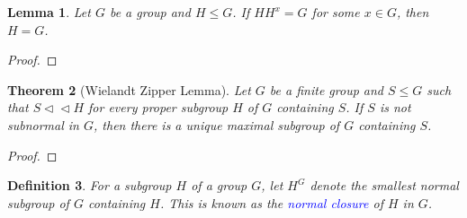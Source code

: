 \documentclass[12pt]{article}
\theoremstyle{thmstyle}
\newtheorem{theorem}{Theorem}[section]
\newtheorem{lemma}[theorem]{Lemma}
\newtheorem{proposition}[theorem]{Proposition}
\theoremstyle{defstyle}
\newtheorem{definition}[theorem]{Definition}
\newcommand{\define}[1]{\textcolor{blue}{\textit{#1}}}
\renewcommand{\le}{\leqslant}
\newcommand{\nor}{\vartriangleleft}
\newcommand{\subnor}{\nor\!\nor}
\begin{document}
\begin{lemma}
    Let $G$ be a group and $H\le G$. If $HH^x = G$ for some $x\in G$, then $H = G$.
\end{lemma}
\begin{proof}
    
\end{proof}

    

\begin{theorem}[Wielandt Zipper Lemma]
    Let $G$ be a finite group and $S\le G$ such that $S\subnor H$ for every proper subgroup $H$ of $G$ containing $S$. If $S$ is not subnormal in $G$, then there is a unique maximal subgroup of $G$ containing $S$.
\end{theorem}
\begin{proof}
    
\end{proof}

\begin{definition}
    For a subgroup $H$ of a group $G$, let $H^G$ denote the smallest normal subgroup of $G$ containing $H$. This is known as the \define{normal closure} of $H$ in $G$.
\end{definition}
\end{document}
